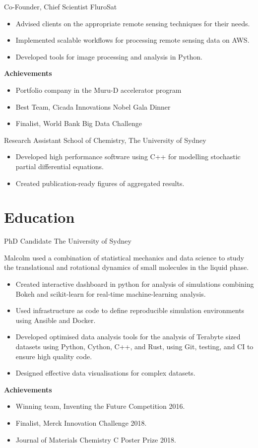 {Co-Founder, Chief Scientist}
{FluroSat}{}{}
{%
  \begin{itemize}
    \item Advised clients on the appropriate remote sensing techniques for their
      needs.
    \item Implemented scalable workflows for processing remote sensing data on AWS.
    \item Developed tools for image processing and analysis in Python.
  \end{itemize}
  \textbf{Achievements}
  \begin{itemize}
    \item Portfolio company in the Muru-D accelerator program
    \item Best Team, Cicada Innovations Nobel Gala Dinner
    \item Finalist, World Bank Big Data Challenge
  \end{itemize}
}

{Research Assistant}
{School of Chemistry, The University of Sydney}
{}{}{%
  \begin{itemize}
    \item Developed high performance software using C++ for modelling
      stochastic partial differential equations.
    \item Created publication-ready figures of aggregated results.
  \end{itemize}
}
\vspace{1em}

\clearpage{}

\section{Education}

{PhD Candidate}
{The University of Sydney}{}{}
{%
  Malcolm used a combination of statistical mechanics and data science to
  study the translational and rotational dynamics
  of small molecules in the liquid phase.
\begin{itemize}
  \item Created interactive dashboard in python for analysis of simulations
    combining Bokeh and scikit-learn for real-time machine-learning analysis.
  \item Used infrastructure as code to define reproducible simulation environments
    using Ansible and Docker.
  \item Developed optimised data analysis tools for the analysis of Terabyte sized
    datasets using Python, Cython, C++, and Rust,
    using Git, testing, and CI to ensure high quality code.
  \item Designed effective data visualisations for complex datasets.
\end{itemize}
\textbf{Achievements}
\begin{itemize}
  \item Winning team, Inventing the Future Competition 2016.
  \item Finalist, Merck Innovation Challenge 2018.
  \item Journal of Materials Chemistry C Poster Prize 2018.
\end{itemize}
}

